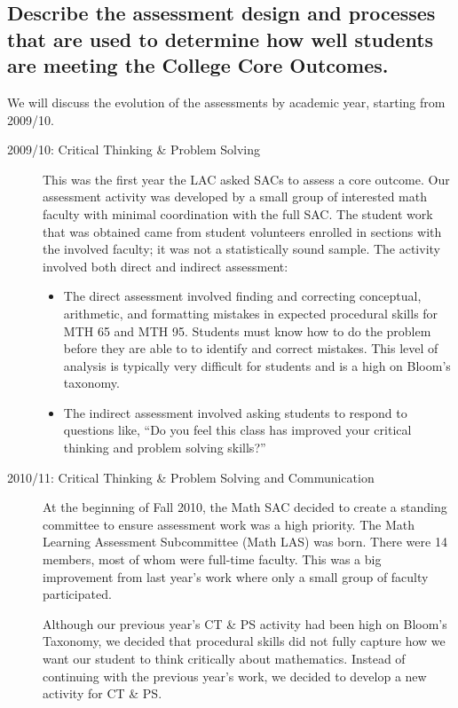 \subsection[Core outcome assessment design and process]{Describe the assessment design and processes that are used to
determine how well students are meeting the College Core Outcomes.}
We will discuss the evolution of the assessments by academic year, starting 
from 2009/10.
\begin{description}
\item [2009/10: Critical Thinking  \& Problem Solving]

This was the first year the LAC asked SACs to assess a core outcome. Our
assessment activity was developed by a small group of interested math faculty
with minimal coordination with the full SAC. The student work that was obtained
came from student volunteers enrolled in sections with the involved faculty; it
was not a statistically sound sample.  The activity involved both direct and
indirect assessment: 
\begin{itemize}
\item The direct assessment involved finding and correcting conceptual,
  arithmetic, and formatting mistakes in expected procedural skills for MTH 65
  and MTH 95. Students must know how to do the problem before they are able to
  to identify and correct mistakes. This level of analysis is typically very
  difficult for students and is a high on Bloom's taxonomy.

\item The indirect assessment involved asking students to respond to questions
  like, ``Do you feel this class has improved your critical thinking and problem
  solving skills?''
\end{itemize}

\item[2010/11:  Critical Thinking \& Problem Solving and Communication]

At the beginning of Fall 2010, the Math SAC decided to create a standing
committee to ensure assessment work was a high priority. The Math Learning
Assessment Subcommittee (Math LAS) was born.  There were 14 members, most of
whom were full-time faculty. This was a big improvement from last year's work
where only a small group of faculty participated.

Although our previous year's CT \& PS activity had been high on Bloom's
Taxonomy, we decided that procedural skills did not fully capture how we want
our student to think critically about mathematics.  Instead of continuing with
the previous year's work, we decided to develop a new activity for CT \& PS. 


\end{description}
